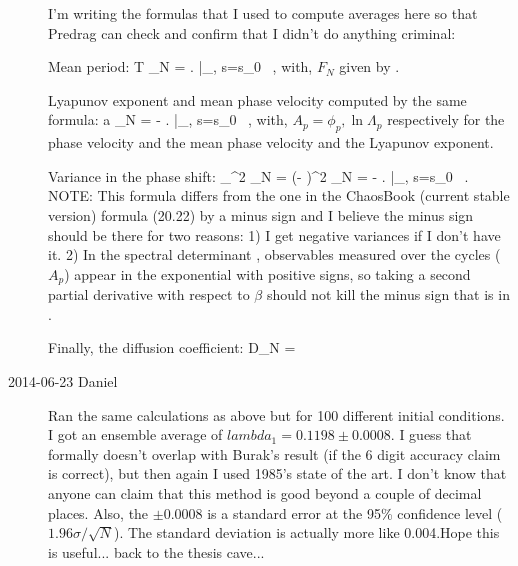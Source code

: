 \begin{description}
I'm writing the formulas that I used to compute averages here so that Predrag 
can check and confirm that I didn't do anything criminal: 

Mean period:
\beq
    \langle T \rangle_N = \left.  
                            \right|_{, s=s_0} \, ,
with, $F_N$ given by . 

Lyapunov exponent and mean phase velocity computed by the same formula:
\beq
    \langle a \rangle_N = -  \left. 
                              \right|_{, s=s_0} \, ,
with, $A_p = \phi_p, \ln \Lambda_p$ respectively for the phase velocity and the 
mean phase velocity and the Lyapunov exponent.

Variance in the phase shift:
\beq
    \langle \sigma_{\phi}^2 \rangle_N = \langle (\phi - \langle \phi 
                                                      \rangle )^2 \rangle_N 
    = - \left.  \right|_{, 
                                                                    s=s_0} \, .
NOTE: This formula differs from the one in the ChaosBook (current stable 
version) formula (20.22) by a minus sign and I believe the minus sign should be 
there for two reasons: 1) I get negative variances if I don't have it. 2) In 
the spectral determinant , observables measured 
over the cycles ($A_p$) appear in the exponential with positive signs, so 
taking a second partial derivative with respect to $\beta$ should not kill the 
minus sign that is in .

Finally, the diffusion coefficient:
\beq
    D_N =  
\eeq

\item[2014-06-23 Daniel] Ran the same calculations as above but for 100 different initial conditions.
I got an ensemble average of $lambda_1 =  0.1198 \pm 0.0008$. I guess that formally doesn't 
overlap with Burak's result (if the 6 digit accuracy claim is correct), but then again I used 1985's 
state of the art. I don't know that anyone can claim that this method is good beyond a couple of decimal
places. Also, the $\pm 0.0008$ is a standard error at the 95\% confidence level ($1.96 \sigma/\sqrt{N}$). The standard deviation is actually more like 0.004.Hope this is useful... back to the thesis cave...


\end{description}
